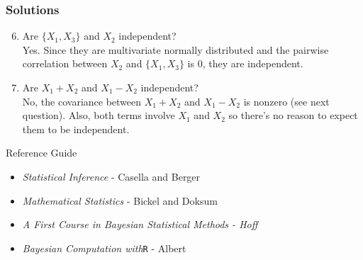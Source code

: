 \documentclass{beamer}
\begin{document}
\begin{frame}
\frametitle{Solutions}
\begin{enumerate}
\setcounter{enumi}{5}

\item Are $\{X_1, X_3\}$ and $X_2$ independent?\\
Yes.  Since they are multivariate normally distributed and the pairwise correlation between $X_2$ and $\{X_1, X_3\}$ is 0, they are independent.

\item Are $X_1 + X_2$ and $X_1 - X_2$ independent?\\
No, the covariance between  $X_1 + X_2$ and $X_1 - X_2$ is nonzero (see next question).  Also, both terms involve $X_1$ and $X_2$ so there's no reason to expect them to be independent.  
\end{enumerate}
\end{frame}

\begin{frame}{Reference Guide}
\begin{itemize}
\item{\emph{Statistical Inference} - Casella and Berger}
\item{\emph{Mathematical Statistics} - Bickel and Doksum}
\item{\emph{A First Course in Bayesian Statistical Methods - Hoff}}
\item{\emph{Bayesian Computation with}\texttt{R} - Albert}
\end{itemize}
\end{frame}
\end{document}
